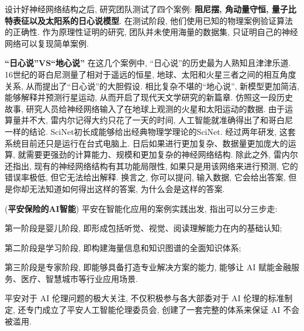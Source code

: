 设计好神经网络结构之后, 研究团队测试了四个案例: \textbf{阻尼摆, 角动量守恒, 量子比特表征以及太阳系的日心说模型}. 在测试阶段, 他们使用已知的物理案例验证算法的正确性. 作为原理性证明的研究, 团队并未使用海量的数据集, 只证明自己的神经网络可以复现简单案例.
\begin{remark}\textbf{“日心说”VS“地心说”}
在这几个案例中, “日心说”的历史最为人熟知且津津乐道. 16世纪的哥白尼测量了相对于遥远的恒星, 地球、太阳和火星三者之间的相互角度关系, 从而提出了“日心说”的大胆假设. 相比复杂不堪的“地心说”, 新模型更加简洁, 能够解释并预测行星运动, 从而开启了现代天文学研究的新篇章.
仿照这一段历史故事, 研究人员给神经网络输入了在地球上观测的火星和太阳运动的数据. 由于运算量并不大, 雷内尔记得大约只花了一天的时间, 人工智能就准确得出了和哥白尼一样的结论.
SciNet初长成能够给出经典物理学理论的SciNet. 经过两年研发, 这套系统目前还只是运行在台式电脑上. 日后如果进行更加复杂、数据量更加庞大的运算, 就需要更强劲的计算能力、规模和更加复杂的神经网络结构.
除此之外, 雷内尔还指出, 现有的神经网络结构有其功能局限性, 如果只是用该网络来进行预测, 它的错误率极低, 但它无法给出解释. 换言之, 你可以提问, 输入数据, 它会给出答案, 但是你却无法知道如何得出这样的答案, 为什么会是这样的答案.
\end{remark}
\begin{example}(\textbf{平安保险的AI智能})
平安在智能化应用的案例实践出发, 指出可以分三步走:

第一阶段是婴儿阶段, 即形成包括听觉、视觉、阅读理解能力在内的基础认知;

第二阶段是学习阶段, 即构建海量信息和知识图谱的全面知识体系;

第三阶段是专家阶段, 即能够具备打造专业解决方案的能力, 能够让 AI 赋能金融服务、医疗、智慧城市等行业应用场景.

平安对于 AI 伦理问题的极大关注, 不仅积极参与各大部委对于 AI 伦理的标准制定, 还专门成立了平安人工智能伦理委员会, 创建了一套完整的体系来保证 AI 不会被滥用.
\end{example}
